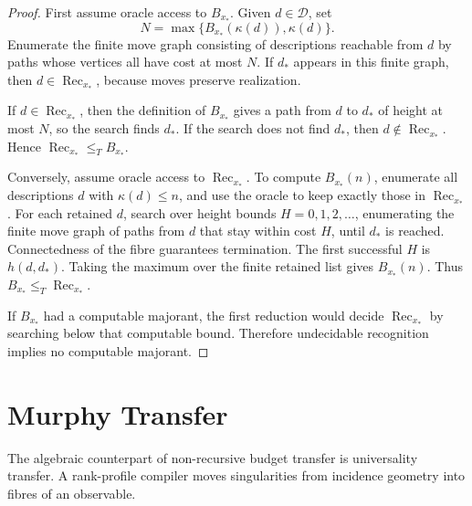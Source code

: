 \documentclass[11pt]{article}
\DeclareMathOperator{\Rec}{Rec}
\begin{document}
\begin{proof}
First assume oracle access to \(B_{x_\ast}\). Given \(d\in\mathcal D\), set
\[
N=\max\{B_{x_\ast}(\kappa(d)),\kappa(d)\}.
\]
Enumerate the finite move graph consisting of descriptions reachable from \(d\) by paths whose vertices all have cost at most \(N\). If \(d_\ast\) appears in this finite graph, then \(d\in\Rec_{x_\ast}\), because moves preserve realization.

If \(d\in\Rec_{x_\ast}\), then the definition of \(B_{x_\ast}\) gives a path from \(d\) to \(d_\ast\) of height at most \(N\), so the search finds \(d_\ast\). If the search does not find \(d_\ast\), then \(d\notin\Rec_{x_\ast}\). Hence \(\Rec_{x_\ast}\leq_T B_{x_\ast}\).

Conversely, assume oracle access to \(\Rec_{x_\ast}\). To compute \(B_{x_\ast}(n)\), enumerate all descriptions \(d\) with \(\kappa(d)\leq n\), and use the oracle to keep exactly those in \(\Rec_{x_\ast}\). For each retained \(d\), search over height bounds \(H=0,1,2,\ldots\), enumerating the finite move graph of paths from \(d\) that stay within cost \(H\), until \(d_\ast\) is reached. Connectedness of the fibre guarantees termination. The first successful \(H\) is \(h(d,d_\ast)\). Taking the maximum over the finite retained list gives \(B_{x_\ast}(n)\). Thus \(B_{x_\ast}\leq_T\Rec_{x_\ast}\).

If \(B_{x_\ast}\) had a computable majorant, the first reduction would decide \(\Rec_{x_\ast}\) by searching below that computable bound. Therefore undecidable recognition implies no computable majorant.
\end{proof}

\section{Murphy Transfer}

The algebraic counterpart of non-recursive budget transfer is universality transfer. A rank-profile compiler moves singularities from incidence geometry into fibres of an observable.
\end{document}
